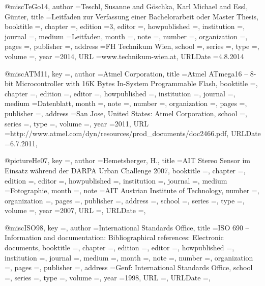 @misc{TeGo14,
	author				={Teschl, Susanne and G{\"o}schka, Karl Michael and Essl, G{\"u}nter},
	title				={{Leitfaden zur Verfassung einer Bachelorarbeit oder Master Thesis}},
	booktitle			={},
	chapter				={},
	edition				={3},
	editor				={},
	howpublished		={},
	institution			={},
	journal				={},
	medium				={Leitfaden},
	month				={},
	note				={},
	number				={},
	organization		={},
	pages				={},
	publisher			={},
	address				={FH Technikum Wien},
	school				={},
	series				={},
	type				={},
	volume				={},
	year				={2014},
	URL	  				={www.technikum-wien.at},
	URLDate				={4.8.2014}
}

@misc{ATM11,
	key					={},
	author				={{Atmel Corporation}},
	title				={Atmel ATmega16 -- 8-bit Microcontroller with 16K Bytes In-System Programmable Flash},
	booktitle			={},
	chapter				={},
	edition				={},
	editor				={},
	howpublished		={},
	institution			={},
	journal				={},
	medium				={Datenblatt},
	month				={},
	note				={},
	number				={},
	organization		={},
	pages				={},
	publisher			={},
	address				={San Jose, United States: Atmel Corporation},
	school				={},
	series				={},
	type				={},
	volume				={},
	year				={2011},
	URL	  				={http://www.atmel.com/dyn/resources/prod\_documents/doc2466.pdf},
	URLDate				={6.7.2011},
}

@picture{He07,
	key					={},
	author				={Hemetsberger, H.},
	title				={AIT Stereo Sensor im Einsatz während der DARPA Urban Challenge 2007},
	booktitle			={},
	chapter				={},
	edition				={},
	editor				={},
	howpublished		={},
	institution			={},
	journal				={},
	medium				={Fotographie},
	month				={},
	note				={AIT Austrian Institute of Technology},
	number				={},
	organization		={},
	pages				={},
	publisher			={},
	address				={},
	school				={},
	series				={},
	type				={},
	volume				={},
	year				={2007},
	URL	  				={},
	URLDate				={},
}

@misc{ISO98,
	key					={},
	author				={{International Standards Office}},
	title				={ISO 690 -- Information and documentation: Bibliographical references: Electronic documents},
	booktitle			={},
	chapter				={},
	edition				={},
	editor				={},
	howpublished		={},
	institution			={},
	journal				={},
	medium				={},
	month				={},
	note				={},
	number				={},
	organization		={},
	pages				={},
	publisher			={},
	address				={Genf: International Standards Office},
	school				={},
	series				={},
	type				={},
	volume				={},
	year				={1998},
	URL	  				={},
	URLDate				={},
}

